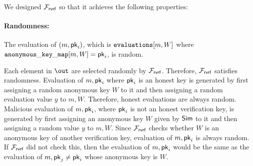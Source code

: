 %
%

We designed $ \mathcal{F}_{\textsf{rvrf}} $ so that it achieves the following properties:

\paragraph{Randomness:}  The evaluation of $ (m, \mathsf{pk}_i) $,  which is $ \texttt{evaluations}[m,W] $ where $ \mathtt{anonymous\_key\_map}[m,W] = \mathsf{pk}_i $, is random.


Each element in $ \out $ are selected randomly by $ \mathcal{F}_{\textsf{rvrf}} $. Therefore, $ \mathcal{F}_{\textsf{rvrf}} $ satisfies randomness.  Evaluation of $ m, \mathsf{pk}_i $ where $ \mathsf{pk}_i $ is an honest key is generated by first assigning a random anonymous key $ W $ to it and then assigning a random evaluation value $ y $ to $ m, W $. Therefore, honest evaluations are always random. Malicious evaluation of $ m, \mathsf{pk}_i $, where $ \mathsf{pk}_i $ is not an honest verification key, is generated by first assigning an anonymous key $ W $ given by $ \mathsf{Sim} $ to it and then assigning a random value $ y $ to $ m, W $. Since $ \mathcal{F}_{\textsf{rvrf}} $ checks whether $ W $ is an anonymous key of another verification key, evaluation of $ m, \mathsf{pk}_i $ is always random. If $ \mathcal{F}_{\textsf{rvrf}} $ did not check this, then the evaluation of $ m, \mathsf{pk}_i $ would be the same as the evaluation of $ m, \mathsf{pk}_j  \neq \mathsf{pk}_i$ whose anonymous key is $ W $.


